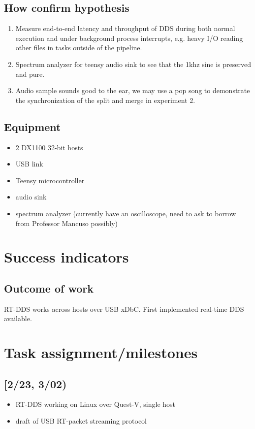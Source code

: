 \documentclass[11pt]{article}
\begin{document}
\subsection{How confirm hypothesis}
\label{sec:orgbf4534d}
\begin{enumerate}
\item Measure end-to-end latency and throughput of DDS during both normal
execution and under background process interrupts, e.g. heavy I/O reading
other files in tasks outside of the pipeline.
\item Spectrum analyzer for teensy audio sink to see that the 1khz sine is
preserved and pure.
\item Audio sample sounds good to the ear, we may use a pop song to demonstrate
the synchronization of the split and merge in experiment 2.
\end{enumerate}
\subsection{Equipment}
\label{sec:orgaca0795}
\begin{itemize}
\item 2 DX1100 32-bit hosts
\item USB link
\item Teensy microcontroller
\item audio sink
\item spectrum analyzer (currently have an oscilloscope, need to ask to borrow
from Professor Mancuso possibly)
\end{itemize}
\section{Success indicators}
\label{sec:org6c55355}
\subsection{Outcome of work}
\label{sec:org7a895ff}
RT-DDS works across hosts over USB xDbC. First implemented real-time
DDS available.
\section{Task assignment/milestones}
\label{sec:org1ecf03a}
\subsection{{[}2/23, 3/02)}
\label{sec:org726e2fa}
\begin{itemize}
\item RT-DDS working on Linux over Quest-V, single host
\item draft of USB RT-packet streaming protocol
\end{itemize}
\end{document}
